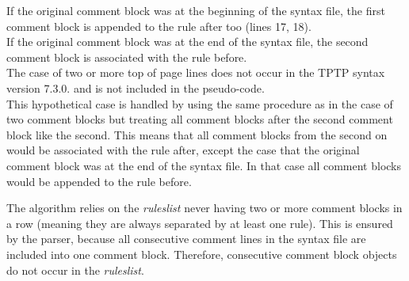 If the original comment block was at the beginning of the syntax file, the first comment block is appended to the rule 
after too (lines 17, 18).\\
If the original comment block was at the end of the syntax file, the second comment block is associated with the rule before.\\
The case of two or more top of page lines does not occur in the \ac{TPTP} syntax version 7.3.0. and is not included in the pseudo-code.\\
This hypothetical case is handled by using the same procedure as in the case of two comment blocks but treating all comment blocks after the second comment block like the second. This means that all comment blocks from the second on would be associated with the rule after, except the case that the original comment block was at the end of the syntax file. In that case all comment blocks would be appended to the rule before.

The algorithm relies on the \textit{rules\textunderscore list} never having two or more comment blocks in a row (meaning they are always separated by at least one rule). This is ensured by the parser, because all consecutive comment lines in the syntax file are included into one comment block. Therefore, consecutive comment block objects do not occur in the \textit{rules\textunderscore list}.

